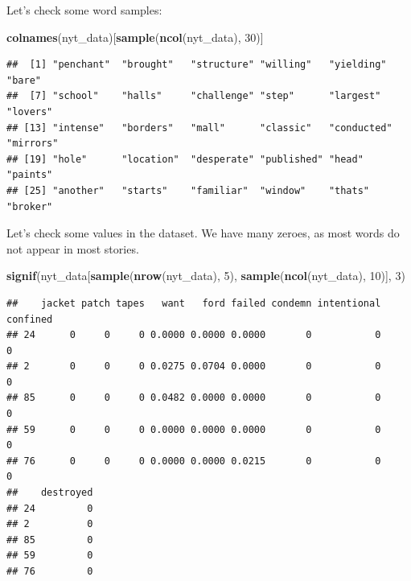 \documentclass[
]{article}
\newenvironment{Shaded}{\begin{snugshade}}{\end{snugshade}}
\newcommand{\DecValTok}[1]{\textcolor[rgb]{0.00,0.00,0.81}{#1}}
\newcommand{\FunctionTok}[1]{\textcolor[rgb]{0.13,0.29,0.53}{\textbf{#1}}}
\newcommand{\NormalTok}[1]{#1}
\newcommand{\SpecialCharTok}[1]{\textcolor[rgb]{0.81,0.36,0.00}{\textbf{#1}}}
\begin{document}
\begin{Shaded}
\end{Shaded}

Let's check some word samples:

\begin{Shaded}
\begin{Highlighting}[]
\FunctionTok{colnames}\NormalTok{(nyt\_data)[}\FunctionTok{sample}\NormalTok{(}\FunctionTok{ncol}\NormalTok{(nyt\_data), }\DecValTok{30}\NormalTok{)]}
\end{Highlighting}
\end{Shaded}

\begin{verbatim}
##  [1] "penchant"  "brought"   "structure" "willing"   "yielding"  "bare"     
##  [7] "school"    "halls"     "challenge" "step"      "largest"   "lovers"   
## [13] "intense"   "borders"   "mall"      "classic"   "conducted" "mirrors"  
## [19] "hole"      "location"  "desperate" "published" "head"      "paints"   
## [25] "another"   "starts"    "familiar"  "window"    "thats"     "broker"
\end{verbatim}

Let's check some values in the dataset. We have many zeroes, as most
words do not appear in most stories.

\begin{Shaded}
\begin{Highlighting}[]
\FunctionTok{signif}\NormalTok{(nyt\_data[}\FunctionTok{sample}\NormalTok{(}\FunctionTok{nrow}\NormalTok{(nyt\_data), }\DecValTok{5}\NormalTok{), }\FunctionTok{sample}\NormalTok{(}\FunctionTok{ncol}\NormalTok{(nyt\_data), }\DecValTok{10}\NormalTok{)], }\DecValTok{3}\NormalTok{)}
\end{Highlighting}
\end{Shaded}

\begin{verbatim}
##    jacket patch tapes   want   ford failed condemn intentional confined
## 24      0     0     0 0.0000 0.0000 0.0000       0           0        0
## 2       0     0     0 0.0275 0.0704 0.0000       0           0        0
## 85      0     0     0 0.0482 0.0000 0.0000       0           0        0
## 59      0     0     0 0.0000 0.0000 0.0000       0           0        0
## 76      0     0     0 0.0000 0.0000 0.0215       0           0        0
##    destroyed
## 24         0
## 2          0
## 85         0
## 59         0
## 76         0
\end{verbatim}
\end{document}
